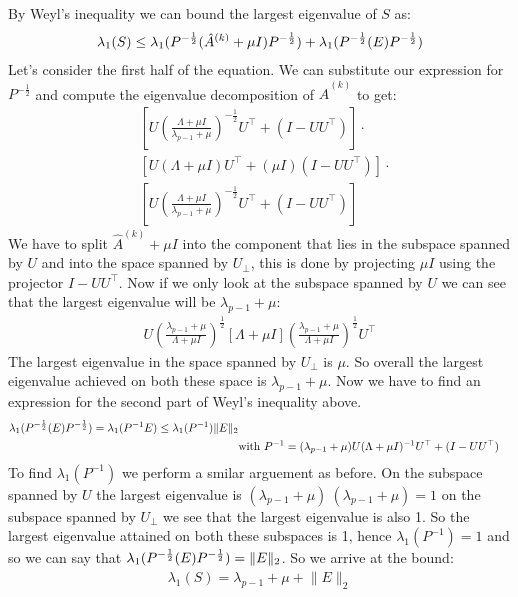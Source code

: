 By Weyl's inequality we can bound the largest eigenvalue of $S$ as:
\begin{align*}
    \lambda_1(S) \leq \lambda_1(P^{-\frac{1}{2}} (\hat{A}^{(k)} + \mu I) P^{-\frac{1}{2}}) + \lambda_1(P^{-\frac{1}{2}} (E) P^{-\frac{1}{2}})
\end{align*}
Let's consider the first half of the equation. We can substitute our expression for $P^{-\frac{1}{2}}$ and compute the eigenvalue decomposition of $\hat{A}^{(k)}$ to get:
\begin{align*}
    &\left[U\left(\frac{\Lambda + \mu I}{\lambda_{p-1} + \mu}\right)^{-\frac{1}{2}}U^{\top} + (I-UU^{\top})\right] \cdot \\
    &\left[U(\Lambda+\mu I)U^{\top} + (\mu I)(I-UU^{\top})\right] \cdot \\
    &\left[U\left(\frac{\Lambda + \mu I}{\lambda_{p-1} + \mu}\right)^{-\frac{1}{2}}U^{\top} + (I-UU^{\top})\right] 
\end{align*}
We have to split $\hat{A}^{(k)} + \mu I$ into the component that lies in the subspace spanned by $U$ and into the space
spanned by $U_{\perp}$, this is done by projecting $\mu I$ using the projector $I - UU^{\top}$. Now if we only look at
the subspace spanned by $U$ we can see that the largest eigenvalue will be $\lambda_{p-1} + \mu$:
\begin{align*}
    U(\frac{\lambda_{p-1} + \mu}{\Lambda + \mu I})^{\frac{1}{2}}[\Lambda + \mu I](\frac{\lambda_{p-1} + \mu}{\Lambda + \mu I})^{\frac{1}{2}}U^{\top}
\end{align*}
The largest eigenvalue in the space spanned by $U_{\perp}$ is $\mu$. So overall the largest eigenvalue achieved on both
these space is $\lambda_{p-1} + \mu$. Now we have to find an expression for the second part of Weyl's inequality above.
\begin{align*}
    \lambda_1(P^{-\frac{1}{2}} (E) P^{-\frac{1}{2}}) = \lambda_1(P^{-1}E) \leq \lambda_1(P^{-1})\lVert E \rVert_2 \\
    & \text{with } P^{-1} = (\lambda_{p-1}+\mu)U(\Lambda + \mu I)^{-1}U^{\top} + (I-UU^{\top})
\end{align*}
To find $\lambda_1(P^{-1})$ we perform a smilar arguement as before. On the subspace spanned by $U$ the largest
eigenvalue is $(\lambda_{p-1} + \mu) \ (\lambda_{p-1} + \mu) = 1$ on the subspace spanned by $U_{\perp}$ we see that the
largest eigenvalue is also 1. So the largest eigenvalue attained on both these subspaces is 1, hence $\lambda_1(P^{-1})
= 1$ and so we can say that $\lambda_1(P^{-\frac{1}{2}} (E) P^{-\frac{1}{2}}) = \lVert E \rVert_2$. So we arrive at the bound:
\begin{align*}
    \lambda_1(S) = \lambda_{p-1} + \mu + \lVert E \rVert_2
\end{align*}
